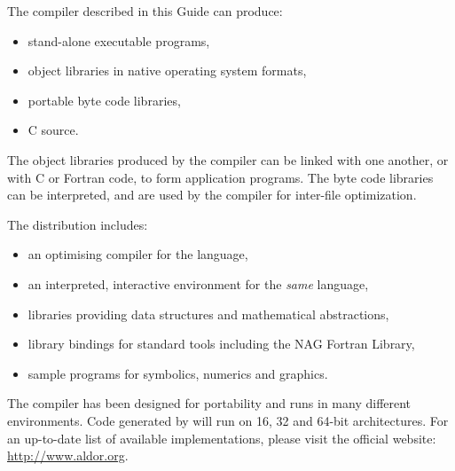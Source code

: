 The \asharp{} compiler described in this Guide can produce:
\begin{itemize}
\item stand-alone executable programs,
\item object libraries in native operating system formats,
\item portable byte code libraries,
\item C source.
\end{itemize}
The object libraries produced by the \asharp{} compiler can be linked
with one another, or with C or Fortran code, to form application
programs.
The byte code libraries can be interpreted, and are used by the compiler
for inter-file optimization.


The \asharp{} distribution includes:
\begin{itemize}
\item an optimising compiler for the \asharp{} language,
\item an interpreted, interactive environment for the {\em same}
      language,
\item libraries providing data structures and mathematical abstractions,
\item library bindings for standard tools including
the NAG Fortran Library,
\item sample programs for symbolics, numerics and graphics.
\end{itemize}


The \asharp{} compiler has been designed for portability and runs
in many different environments.
Code generated by \asharp{} will run on 16, 32 and 64-bit architectures.
%
For an up-to-date list of available implementations, please visit the
official \asharp{} website: \url{http://www.aldor.org}.

